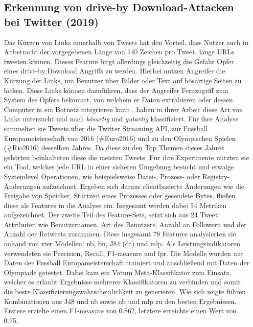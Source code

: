 \documentclass[
    12pt, %
    DIV10,
    ngerman, %
    a4paper, %
    oneside, %
    titlepage, %
    parskip=half, %
    headings=normal, %
    listof=totoc, %
    bibliography=totoc, %
    index=totoc, %
    captions=tableheading, %
    final %
]{scrreprt}
\begin{document}
\subsection{Erkennung von drive-by Download-Attacken bei Twitter (2019)}
Das Kürzen von Links innerhalb von Tweets hat den Vorteil, dass Nutzer auch in Anbetracht der vorgegebenen Länge von 140 Zeichen pro Tweet, lange URLs tweeten können. Dieses Feature birgt allerdings gleichzeitig die Gefahr Opfer eines drive-by Download Angriffs zu werden. Hierbei nutzen Angreifer die Kürzung der Links, um Benutzer über Bilder oder Text auf bösartige Seiten zu locken.
Diese Links können dazuführen, dass der Angreifer Fernzugriff zum System des Opfers bekommt, von welchem er Daten extrahieren oder dessen Computer in ein Botnetz integrieren kann \parencite{provos2007ghost}.
\textcite{Javed2019} haben in ihrer Arbeit diese Art von Links untersucht und nach \emph{bösartig} und \emph{gutartig} klassifiziert. Für ihre Analyse sammelten sie Tweets über die Twitter Streaming API, zur Fussball Europameisterschaft von 2016 (\#Euro2016) und zu den Olympischen Spielen (\#Rio2016) desselben Jahres. Da diese zu den Top Themen dieses Jahres gehörten beinhalteten diese die meisten Tweets. Für ihre Experimente nutzten sie ein Tool, welches jede URL in einer sicheren Umgebung besucht und etwaige Systemlevel Operationen, wie beispielsweise Datei-, Prozess- oder Registry-Änderungen aufzeichnet. Ergeben sich daraus clientbasierte Änderungen wie die Freigabe von Speicher, Startzeit eines Prozesses oder gesendete Bytes, fließen diese als Features in die Analyse ein. Insgesamt werden dabei 54 Metriken aufgezeichnet. Der zweite Teil des Feature-Sets, setzt sich aus 24 Tweet Attributen wie Benutzernamen, Art des Benutzers, Anzahl an Followern und der Anzahl der Retweets zusammen. Diese insgesamt 78 Features analysierten sie anhand von vier Modellen: \acl{nb}, \acl{bn}, J84 (\acl{dt}) und \ac{mlp}. Als Leistungsindikatoren verwendeten sie Precision, Recall, F1-measure und \ac{fpr}. Die Modelle wurden mit Daten der Fussball Europameisterschaft trainiert und anschließend mit Daten der Olympiade getestet. Dabei kam ein Votum Meta-Klassifikator zum  Einsatz, welcher es erlaubt Ergebnisse mehrerer Klassifikatoren zu verbinden und somit die beste Klassifizierungswahrscheinlichkeit zu generieren. Wie sich zeigte führen Kombinationen aus J48 und \ac{nb} sowie \ac{nb} und \ac{mlp} zu den besten Ergebnissen. Erstere erzielte einen F1-measure von 0.862, letztere erreichte einen Wert von 0.75.
\end{document}
